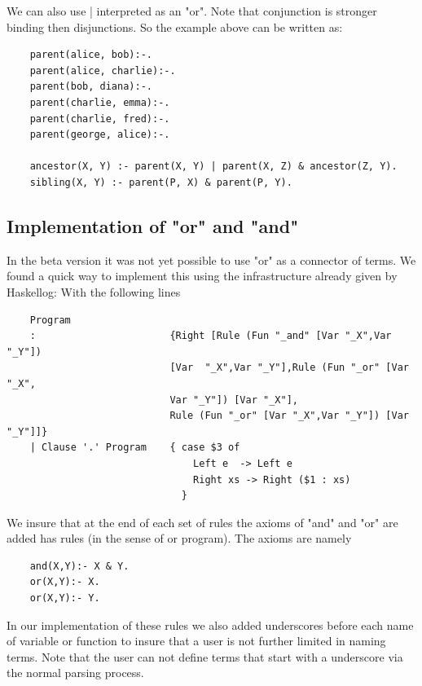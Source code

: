 We can also use \verb||| interpreted as an "or". Note that conjunction is stronger binding then disjunctions. So the example above can be written as:
\begin{verbatim}
    parent(alice, bob):-.
    parent(alice, charlie):-.
    parent(bob, diana):-.
    parent(charlie, emma):-.
    parent(charlie, fred):-.
    parent(george, alice):-.

    ancestor(X, Y) :- parent(X, Y) | parent(X, Z) & ancestor(Z, Y).
    sibling(X, Y) :- parent(P, X) & parent(P, Y).
\end{verbatim}
\subsection{Implementation of "or" and "and"}
In the beta version it was not yet possible to use "or" as a connector of terms. We found a quick way to implement this using the infrastructure already given by Haskellog:
With the following lines
\begin{verbatim}
    Program
    :                       {Right [Rule (Fun "_and" [Var "_X",Var "_Y"]) 
                            [Var  "_X",Var "_Y"],Rule (Fun "_or" [Var "_X",
                            Var "_Y"]) [Var "_X"],
                            Rule (Fun "_or" [Var "_X",Var "_Y"]) [Var "_Y"]]}
    | Clause '.' Program    { case $3 of
                                Left e  -> Left e
                                Right xs -> Right ($1 : xs)
                              }
\end{verbatim}
We insure that at the end of each set of rules the axioms of "and" and "or" are added has rules (in the sense of or program). The axioms are namely
\begin{verbatim}
    and(X,Y):- X & Y.
    or(X,Y):- X.
    or(X,Y):- Y.
\end{verbatim}
In our implementation of these rules we also added underscores before each name of variable or function to insure that a user is not further limited in naming terms. Note that the user can not define terms that start with a underscore via the normal parsing process.


